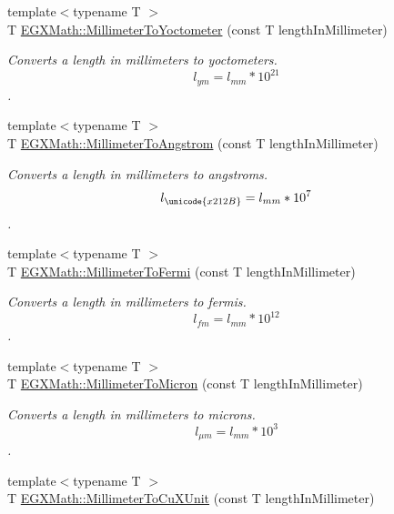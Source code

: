 \begin{DoxyCompactItemize}
{\footnotesize template$<$typename T $>$ }\\T \mbox{\hyperlink{group___e_g_x_math-_conversions-_length_conversions-_s_i-_millimeter-_s_i_ga7f8020bb633d6ed2cd874a8c66d2893d}{E\+G\+X\+Math\+::\+Millimeter\+To\+Yoctometer}} (const T length\+In\+Millimeter)
\begin{DoxyCompactList}\small\item\em Converts a length in millimeters to yoctometers. \[ l_{ym}=l_{mm} * 10^{21} \]. \end{DoxyCompactList}\item 
{\footnotesize template$<$typename T $>$ }\\T \mbox{\hyperlink{group___e_g_x_math-_conversions-_length_conversions-_s_i-_millimeter-_non-_s_i_ga40e4659f4689e5be54f8e28fd8ce0008}{E\+G\+X\+Math\+::\+Millimeter\+To\+Angstrom}} (const T length\+In\+Millimeter)
\begin{DoxyCompactList}\small\item\em Converts a length in millimeters to angstroms. \[ l_{\unicode{x212B}}=l_{mm} * 10^{7} \]. \end{DoxyCompactList}\item 
{\footnotesize template$<$typename T $>$ }\\T \mbox{\hyperlink{group___e_g_x_math-_conversions-_length_conversions-_s_i-_millimeter-_non-_s_i_gaeb57dff8b2e092b5a655ffdd9960897d}{E\+G\+X\+Math\+::\+Millimeter\+To\+Fermi}} (const T length\+In\+Millimeter)
\begin{DoxyCompactList}\small\item\em Converts a length in millimeters to fermis. \[ l_{fm}=l_{mm} * 10^{12} \]. \end{DoxyCompactList}\item 
{\footnotesize template$<$typename T $>$ }\\T \mbox{\hyperlink{group___e_g_x_math-_conversions-_length_conversions-_s_i-_millimeter-_non-_s_i_ga47eac74d2eeec20afc801e61d53f67a0}{E\+G\+X\+Math\+::\+Millimeter\+To\+Micron}} (const T length\+In\+Millimeter)
\begin{DoxyCompactList}\small\item\em Converts a length in millimeters to microns. \[ l_{\mu m}=l_{mm} * 10^{3} \]. \end{DoxyCompactList}\item 
{\footnotesize template$<$typename T $>$ }\\T \mbox{\hyperlink{group___e_g_x_math-_conversions-_length_conversions-_s_i-_millimeter-_non-_s_i_gaa9a94e1f42047955530f673047c4370b}{E\+G\+X\+Math\+::\+Millimeter\+To\+Cu\+X\+Unit}} (const T length\+In\+Millimeter)

\end{DoxyCompactItemize}
